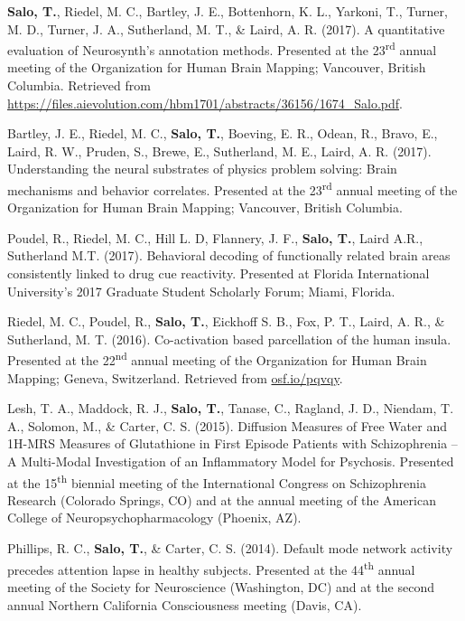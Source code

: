 \documentclass[10pt]{article}
\begin{document}
\begin{hangparas}{.25in}{1}
\textbf{Salo, T.}, Riedel, M. C., Bartley, J. E., Bottenhorn, K. L., Yarkoni, T., Turner, M. D., Turner, J. A., Sutherland, M. T., \& Laird, A. R. (2017). A quantitative evaluation of Neurosynth's annotation methods. Presented at the 23\textsuperscript{rd} annual meeting of the Organization for Human Brain Mapping; Vancouver, British Columbia. Retrieved from \href{https://files.aievolution.com/hbm1701/abstracts/36156/1674_Salo.pdf}{https://files.aievolution.com/hbm1701/abstracts/36156/1674\_Salo.pdf}.
\end{hangparas}

\bigskip

\begin{hangparas}{.25in}{1}
Bartley, J. E., Riedel, M. C., \textbf{Salo, T.}, Boeving, E. R., Odean, R., Bravo, E., Laird, R. W., Pruden, S., Brewe, E., Sutherland, M. E., Laird, A. R. (2017). Understanding the neural substrates of physics problem solving: Brain mechanisms and behavior correlates. Presented at the 23\textsuperscript{rd} annual meeting of the Organization for Human Brain Mapping; Vancouver, British Columbia.

\bigskip

Poudel, R.,  Riedel, M. C., Hill L. D, Flannery, J. F., \textbf{Salo, T.}, Laird A.R., Sutherland M.T. (2017). Behavioral decoding of functionally related brain areas consistently linked to drug cue reactivity. Presented at Florida International University's 2017 Graduate Student Scholarly Forum; Miami, Florida.

\bigskip

Riedel, M. C., Poudel, R., \textbf{Salo, T.}, Eickhoff S. B., Fox, P. T., Laird, A. R., \& Sutherland, M. T. (2016). Co-activation based parcellation of the human insula. Presented at the 22\textsuperscript{nd} annual meeting of the Organization for Human Brain Mapping; Geneva, Switzerland. Retrieved from \href{https://osf.io/pqvqy}{osf.io/pqvqy}.

\bigskip

Lesh, T. A., Maddock, R. J., \textbf{Salo, T.}, Tanase, C., Ragland, J. D., Niendam, T. A., Solomon, M., \& Carter, C. S. (2015). Diffusion Measures of Free Water and 1H-MRS Measures of Glutathione in First Episode Patients with Schizophrenia -- A Multi-Modal Investigation of an Inflammatory Model for Psychosis. Presented at the 15\textsuperscript{th} biennial meeting of the International Congress on Schizophrenia Research (Colorado Springs, CO) and at the annual meeting of the American College of Neuropsychopharmacology (Phoenix, AZ).

\bigskip

Phillips, R. C., \textbf{Salo, T.}, \& Carter, C. S. (2014). Default mode network activity precedes attention lapse in healthy subjects. Presented at the 44\textsuperscript{th} annual meeting of the Society for Neuroscience (Washington, DC) and at the second annual Northern California Consciousness meeting (Davis, CA).
\end{hangparas}
\end{document}
